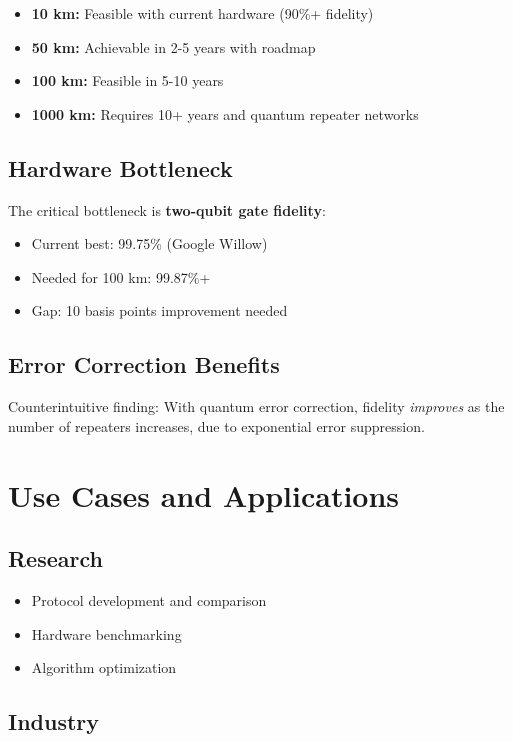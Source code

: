 \documentclass[11pt,a4paper]{article}
\begin{document}
\begin{itemize}
    \item \textbf{10 km:} Feasible with current hardware (90\%+ fidelity)
    \item \textbf{50 km:} Achievable in 2-5 years with roadmap
    \item \textbf{100 km:} Feasible in 5-10 years
    \item \textbf{1000 km:} Requires 10+ years and quantum repeater networks
\end{itemize}

\subsection{Hardware Bottleneck}

The critical bottleneck is \textbf{two-qubit gate fidelity}:
\begin{itemize}
    \item Current best: 99.75\% (Google Willow)
    \item Needed for 100 km: 99.87\%+
    \item Gap: 10 basis points improvement needed
\end{itemize}

\subsection{Error Correction Benefits}

Counterintuitive finding: With quantum error correction, fidelity \textit{improves} as the number of repeaters increases, due to exponential error suppression.

\section{Use Cases and Applications}

\subsection{Research}

\begin{itemize}
    \item Protocol development and comparison
    \item Hardware benchmarking
    \item Algorithm optimization
\end{itemize}

\subsection{Industry}
\end{document}
